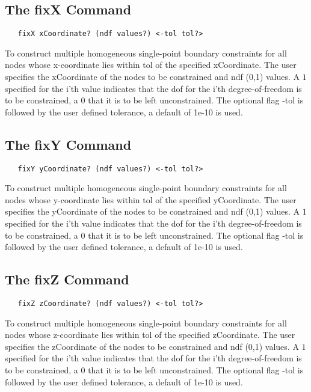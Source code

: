 \documentclass[12pt]{article}
\begin{document}
\subsection{The fixX Command}
{\sf\small
\begin{verbatim}
   fixX xCoordinate? (ndf values?) <-tol tol?>
\end{verbatim}
}

To construct multiple homogeneous single-point boundary constraints for 
all nodes whose x-coordinate lies within tol of the specified xCoordinate.
The user specifies the xCoordinate of the nodes to be constrained and ndf (0,1)
values. A $1$ specified for the i'th value indicates that the dof for
the i'th degree-of-freedom is to be constrained, a $0$ that it is to be
left unconstrained. The optional flag -tol is followed by the user defined 
tolerance, a default of 1e-10 is used.

\subsection{The fixY Command}
{\sf\small
\begin{verbatim}
   fixY yCoordinate? (ndf values?) <-tol tol?>
\end{verbatim}
}

To construct multiple homogeneous single-point boundary constraints for 
all nodes whose y-coordinate lies within tol of the specified yCoordinate.
The user specifies the yCoordinate of the nodes to be constrained and ndf (0,1)
values. A $1$ specified for the i'th value indicates that the dof for
the i'th degree-of-freedom is to be constrained, a $0$ that it is to be
left unconstrained. The optional flag -tol is followed by the user defined 
tolerance, a default of 1e-10 is used.

\subsection{The fixZ Command}
{\sf\small
\begin{verbatim}
   fixZ zCoordinate? (ndf values?) <-tol tol?>
\end{verbatim}
}

To construct multiple homogeneous single-point boundary constraints for 
all nodes whose z-coordinate lies within tol of the specified zCoordinate.
The user specifies the zCoordinate of the nodes to be constrained and ndf (0,1)
values. A $1$ specified for the i'th value indicates that the dof for
the i'th degree-of-freedom is to be constrained, a $0$ that it is to be
left unconstrained. The optional flag -tol is followed by the user defined 
tolerance, a default of 1e-10 is used.
\end{document}

